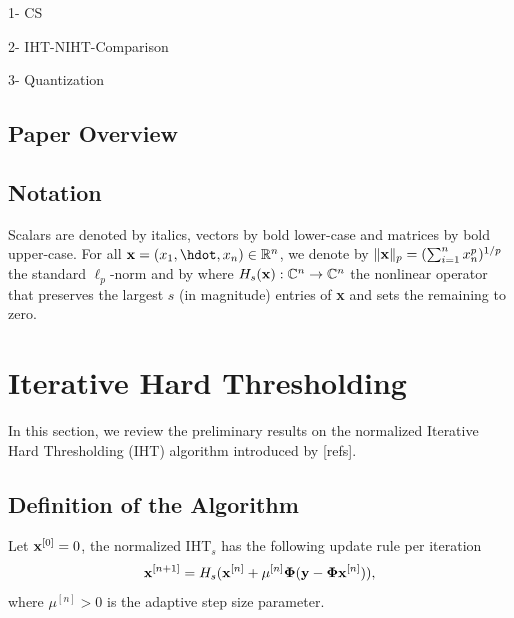 \documentclass{article}
\begin{document}
1- CS

2- IHT-NIHT-Comparison

3- Quantization

\subsection{Paper Overview}

\subsection{Notation}
Scalars are denoted by italics, vectors by bold lower-case and matrices by bold upper-case. For all ${\bf x}= (x_1, \hdot, x_n) \in \mathbb{R}^n$, we denote by $\|{\bf x}\|_p = (\sum_{i=1}^n x_n^p)^{1/p}$ the standard ${\ell}_p$-norm and by
where $H_s({\bf x}): \mathbb{C}^n \rightarrow \mathbb{C}^n$ the nonlinear operator that preserves the largest $s$ (in magnitude) entries of {\bf x} and sets the remaining to zero. 
\section{Iterative Hard Thresholding}
In this section, we review the preliminary results on the normalized Iterative Hard Thresholding (IHT) algorithm introduced by [refs].

\subsection{Definition of the Algorithm} 
Let ${\bf x}^{[0]} = 0$, the normalized IHT$_s$ has the following update rule per iteration
\begin{equation}\label{iht_update_rule}
{\bf x}^{[n+1]} = H_s({\bf x}^{[n]} + \mu^{[n]}{\bf \Phi}({\bf y}-{\bf \Phi}{\bf x}^{[n]})),
\end{equation}
where $\mu^{[n]}>0$ is the adaptive step size parameter. %
\end{document}
